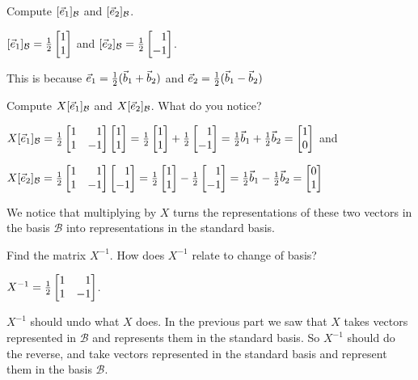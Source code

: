 \documentclass{problemset}
\begin{document}
	\begin{parts}
		\item Compute $[{\vec e_1}]_{\mathcal B}$ and $[{\vec e_2}]_{\mathcal B}$.
			\begin{solution}
				$[\xhat]_{\mathcal B}=\frac{1}{2}\mat{1\\1}$ and
				$[\yhat]_{\mathcal B}=\frac{1}{2}\mat{1\\-1}$.

				This is because ${\vec e_1}=\frac{1}{2}(\vec b_1+\vec b_2)$ and
				${\vec e_2}=\frac{1}{2}(\vec b_1-\vec b_2)$
			\end{solution}
		\item Compute $X[{\vec e_1}]_{\mathcal B}$ and $X[{\vec e_2}]_{\mathcal B}$.
			What do you notice?
			\begin{solution}
				$X[\xhat]_{\mathcal B}=\frac{1}{2}\mat{1&1\\1&-1}\mat{1\\1}
				=\frac{1}{2}\mat{1\\1}+\frac{1}{2}\mat{1\\-1}
				=\frac{1}{2}\vec b_1+\frac{1}{2}\vec b_2=\mat{1\\0}$
				and

				$X[\yhat]_{\mathcal B}=\frac{1}{2}\mat{1&1\\1&-1}\mat{1\\-1}
				=\frac{1}{2}\mat{1\\1}-\frac{1}{2}\mat{1\\-1}
				=\frac{1}{2}\vec b_1-\frac{1}{2}\vec b_2=\mat{0\\1}$

				We notice that multiplying by $X$ turns the representations	of
				these two vectors in the basis $\mathcal B$ into representations
				in the standard basis.
			\end{solution}
		\item Find the matrix $X^{-1}$. How does $X^{-1}$ relate to change of basis?
			\begin{solution}
				$X^{-1}=\tfrac{1}{2}\mat{1&1\\1&-1}$.

				$X^{-1}$ should undo what $X$ does. In the previous part we saw
				that $X$ takes vectors represented in $\mathcal B$ and represents
				them in the standard basis. So $X^{-1}$ should do the reverse, and
				take vectors represented in the standard basis and represent them
				in the basis $\mathcal B$.
			\end{solution}
	\end{parts}
\end{document}
